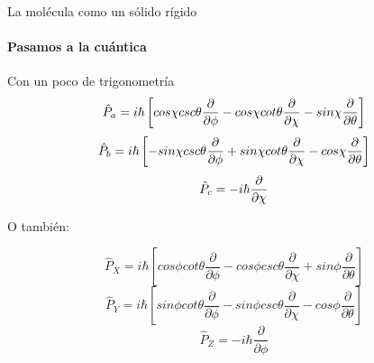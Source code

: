\documentclass[a4paper]{beamer}
\begin{document}
\begin{frame}{La molécula como un sólido rígido}
\framesubtitle{Pasamos a la cuántica}
Con un poco de trigonometría
\begin{equation*}
{\tiny\hat P_a = i\hbar \left[cos\chi csc\theta \frac{\partial}{\partial \phi} - cos\chi cot\theta \frac{\partial}{\partial \chi} - sin\chi \frac{\partial}{\partial \theta} \right]}
\end{equation*}
\begin{equation*}
\tiny\hat P_b = i\hbar \left[-sin\chi csc\theta \frac{\partial}{\partial \phi} + sin\chi cot\theta \frac{\partial}{\partial \chi} - cos\chi \frac{\partial}{\partial \theta} \right]
\end{equation*}
\begin{equation*}
\tiny\hat P_c = -i\hbar \frac{\partial}{\partial\chi}
\end{equation*}

O también:

\begin{equation*}
\hat P_X = i\hbar \left[cos\phi cot\theta \frac{\partial}{\partial \phi} - cos\phi csc\theta \frac{\partial}{\partial \chi} + sin\phi \frac{\partial}{\partial \theta} \right]
\end{equation*}
\begin{equation*}
\hat P_Y = i\hbar \left[sin\phi cot\theta \frac{\partial}{\partial \phi} - sin\phi csc\theta \frac{\partial}{\partial \chi} - cos\phi \frac{\partial}{\partial \theta} \right]
\end{equation*}
\begin{equation*}
\hat P_Z = -i\hbar\frac{\partial}{\partial\phi} 
\end{equation*}
\end{frame}
\end{document}
